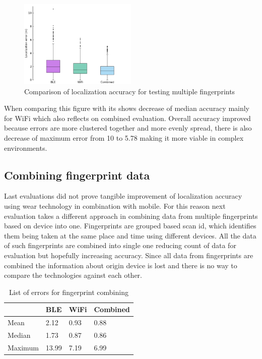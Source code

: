 \begin{figure}[h!]
	\begin{centering}
		\includegraphics[width=0.5\textwidth]{img/wknn_errors_multiple}
		\par\end{centering}
	\caption{Comparison of localization accuracy for testing multiple fingerprints}
	\label{fig07c06}
\end{figure}

When comparing this figure with  its shows decrease of median accuracy mainly for WiFi which also reflects on combined evaluation. Overall accuracy improved because errors are more clustered together and more evenly spread, there is also decrease of maximum error from 10 to 5.78 making it more viable in complex environments.

\subsection{Combining fingerprint data}\label{sec:CombiningFingerprintData}
Last evaluations did not prove tangible improvement of localization accuracy using wear technology in combination with mobile. For this reason next evaluation takes a different approach in combining data from multiple fingerprints based on device into one. Fingerprints are grouped based scan id, which identifies them being taken at the same place and time using different devices. All the data of such fingerprints are combined into single one reducing count of data for evaluation but hopefully increasing accuracy. Since all data from fingerprints are combined the information about origin device is lost and there is no way to compare the technologies against each other.

\begin{table}[h]
	\begin{center}
		\begin{tabular}{ l C{2cm} C{2cm} C{2cm} }
			\hline
			& BLE & WiFi & Combined \\ 
			\hline	
			Mean & 2.12 & 0.93 & 0.88 \\
			Median & 1.73 & 0.87 & 0.86 \\
			Maximum & 13.99 & 7.19 & 6.99 \\
			\hline
		\end{tabular}
		\caption{List of errors for fingerprint combining}
		\label{tab07c06}
	\end{center}
\end{table}

